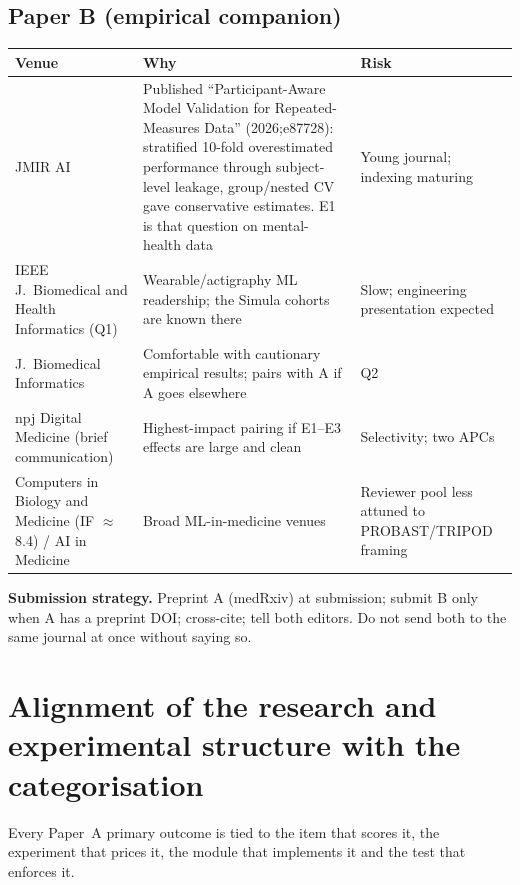 \documentclass[11pt,a4paper]{article}
\begin{document}
\subsection{Paper B (empirical companion)}
\begin{tabularx}{\linewidth}{@{}>{\RaggedRight}p{3.4cm} L L@{}}
\toprule
\textbf{Venue} & \textbf{Why} & \textbf{Risk}\\
\midrule
JMIR AI & Published ``Participant-Aware Model Validation for Repeated-Measures Data'' (2026;e87728): stratified 10-fold overestimated performance through subject-level leakage, group/nested CV gave conservative estimates. E1 is that question on mental-health data & Young journal; indexing maturing\\
IEEE J.\ Biomedical and Health Informatics (Q1) & Wearable/actigraphy ML readership; the Simula cohorts are known there & Slow; engineering presentation expected\\
J.\ Biomedical Informatics & Comfortable with cautionary empirical results; pairs with A if A goes elsewhere & Q2\\
npj Digital Medicine (brief communication) & Highest-impact pairing if E1--E3 effects are large and clean & Selectivity; two APCs\\
Computers in Biology and Medicine (IF $\approx$8.4) / AI in Medicine & Broad ML-in-medicine venues & Reviewer pool less attuned to PROBAST/TRIPOD framing\\
\bottomrule
\end{tabularx}

\textbf{Submission strategy.} Preprint A (medRxiv) at submission; submit B only when A has a
preprint DOI; cross-cite; tell both editors. Do not send both to the same journal at once without
saying so.

\section{Alignment of the research and experimental structure with the categorisation}\label{sec:align}
Every Paper~A primary outcome is tied to the item that scores it, the experiment that prices it,
the module that implements it and the test that enforces it.
\end{document}
